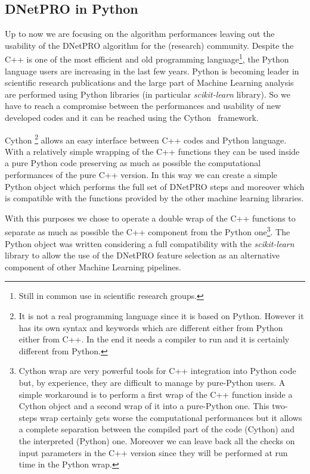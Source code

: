 \documentclass{standalone}
\begin{document}
\subsection[Python wrap]{DNetPRO in Python}\label{implementation:python}

Up to now we are focusing on the algorithm performances leaving out the usability of the DNetPRO algorithm for the (research) community.
Despite the C++ is one of the most efficient and old programming language\footnote{
  Still in common use in scientific research groups.
}, the Python language users are increasing in the last few years.
Python is becoming leader in scientific research publications and the large part of Machine Learning analysis are performed using Python libraries (in particular \emph{scikit-learn} library).
So we have to reach a compromise between the performances and usability of new developed codes and it can be reached using the Cython~\cite{behnel2010cython} framework.

Cython \footnote{
  It is not a real programming language since it is based on Python.
  However it has its own syntax and keywords which are different either from Python either from C++.
  In the end it needs a compiler to run and it is certainly different from Python.
} allows an easy interface between C++ codes and Python language.
With a relatively simple wrapping of the C++ functions they can be used inside a pure Python code preserving as much as possible the computational performances of the pure C++ version.
In this way we can create a simple Python object which performs the full set of DNetPRO steps and moreover which is compatible with the functions provided by the other machine learning libraries.

With this purposes we chose to operate a double wrap of the C++ functions to separate as much as possible the C++ component from the Python one\footnote{
  Cython wrap are very powerful tools for C++ integration into Python code but, by experience, they are difficult to manage by pure-Python users.
  A simple workaround is to perform a first wrap of the C++ function inside a Cython object and a second wrap of it into a pure-Python one.
  This two-steps wrap certainly gets worse the computational performances but it allows a complete separation between the compiled part of the code (Cython) and the interpreted (Python) one.
  Moreover we can leave back all the checks on input parameters
  in the C++ version since they will be performed at run time in the Python wrap.
}.
The Python object was written considering a full compatibility with the \emph{scikit-learn} library to allow the use of the DNetPRO feature selection as an alternative component of other Machine Learning pipelines.
\end{document}
